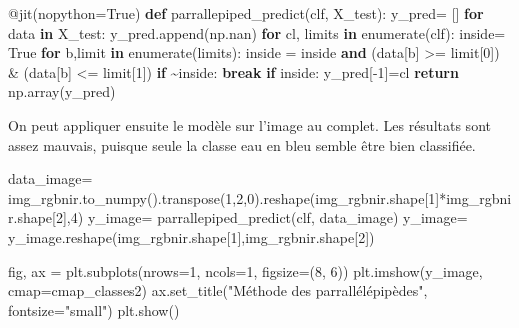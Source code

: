 \documentclass[
  french,
  11pt,
  letterpaper,
  open=any,
  twoside=false,
  french]{scrbook}
\newenvironment{Shaded}{\begin{snugshade}}{\end{snugshade}}
\newcommand{\AttributeTok}[1]{\textcolor[rgb]{0.40,0.45,0.13}{#1}}
\newcommand{\BuiltInTok}[1]{\textcolor[rgb]{0.00,0.23,0.31}{#1}}
\newcommand{\ControlFlowTok}[1]{\textcolor[rgb]{0.00,0.23,0.31}{\textbf{#1}}}
\newcommand{\DecValTok}[1]{\textcolor[rgb]{0.68,0.00,0.00}{#1}}
\newcommand{\KeywordTok}[1]{\textcolor[rgb]{0.00,0.23,0.31}{\textbf{#1}}}
\newcommand{\NormalTok}[1]{\textcolor[rgb]{0.00,0.23,0.31}{#1}}
\newcommand{\OperatorTok}[1]{\textcolor[rgb]{0.37,0.37,0.37}{#1}}
\newcommand{\StringTok}[1]{\textcolor[rgb]{0.13,0.47,0.30}{#1}}
\newcommand{\VariableTok}[1]{\textcolor[rgb]{0.07,0.07,0.07}{#1}}
\begin{document}
\begin{Shaded}
\begin{Highlighting}[]
\AttributeTok{@jit}\NormalTok{(nopython}\OperatorTok{=}\VariableTok{True}\NormalTok{)}
\KeywordTok{def}\NormalTok{ parrallepiped\_predict(clf, X\_test):}
\NormalTok{  y\_pred}\OperatorTok{=}\NormalTok{ []}
  \ControlFlowTok{for}\NormalTok{ data }\KeywordTok{in}\NormalTok{ X\_test:}
\NormalTok{    y\_pred.append(np.nan)}
    \ControlFlowTok{for}\NormalTok{ cl, limits }\KeywordTok{in} \BuiltInTok{enumerate}\NormalTok{(clf):}
\NormalTok{      inside}\OperatorTok{=} \VariableTok{True}
      \ControlFlowTok{for}\NormalTok{ b,limit }\KeywordTok{in} \BuiltInTok{enumerate}\NormalTok{(limits):}
\NormalTok{        inside }\OperatorTok{=}\NormalTok{ inside }\KeywordTok{and}\NormalTok{ (data[b] }\OperatorTok{\textgreater{}=}\NormalTok{ limit[}\DecValTok{0}\NormalTok{]) }\OperatorTok{\&}\NormalTok{ (data[b] }\OperatorTok{\textless{}=}\NormalTok{ limit[}\DecValTok{1}\NormalTok{])}
        \ControlFlowTok{if} \OperatorTok{\textasciitilde{}}\NormalTok{inside:}
          \ControlFlowTok{break}
      \ControlFlowTok{if}\NormalTok{ inside:}
\NormalTok{        y\_pred[}\OperatorTok{{-}}\DecValTok{1}\NormalTok{]}\OperatorTok{=}\NormalTok{cl}
  \ControlFlowTok{return}\NormalTok{ np.array(y\_pred)}
\end{Highlighting}
\end{Shaded}

On peut appliquer ensuite le modèle sur l'image au complet. Les
résultats sont assez mauvais, puisque seule la classe eau en bleu semble
être bien classifiée.

\begin{Shaded}
\begin{Highlighting}[]
\NormalTok{data\_image}\OperatorTok{=}\NormalTok{ img\_rgbnir.to\_numpy().transpose(}\DecValTok{1}\NormalTok{,}\DecValTok{2}\NormalTok{,}\DecValTok{0}\NormalTok{).reshape(img\_rgbnir.shape[}\DecValTok{1}\NormalTok{]}\OperatorTok{*}\NormalTok{img\_rgbnir.shape[}\DecValTok{2}\NormalTok{],}\DecValTok{4}\NormalTok{)}
\NormalTok{y\_image}\OperatorTok{=}\NormalTok{ parrallepiped\_predict(clf, data\_image)}
\NormalTok{y\_image}\OperatorTok{=}\NormalTok{ y\_image.reshape(img\_rgbnir.shape[}\DecValTok{1}\NormalTok{],img\_rgbnir.shape[}\DecValTok{2}\NormalTok{])}

\NormalTok{fig, ax }\OperatorTok{=}\NormalTok{ plt.subplots(nrows}\OperatorTok{=}\DecValTok{1}\NormalTok{, ncols}\OperatorTok{=}\DecValTok{1}\NormalTok{, figsize}\OperatorTok{=}\NormalTok{(}\DecValTok{8}\NormalTok{, }\DecValTok{6}\NormalTok{))}
\NormalTok{plt.imshow(y\_image, cmap}\OperatorTok{=}\NormalTok{cmap\_classes2)}
\NormalTok{ax.set\_title(}\StringTok{"Méthode des parrallélépipèdes"}\NormalTok{, fontsize}\OperatorTok{=}\StringTok{"small"}\NormalTok{)}
\NormalTok{plt.show()}
\end{Highlighting}
\end{Shaded}
\end{document}
